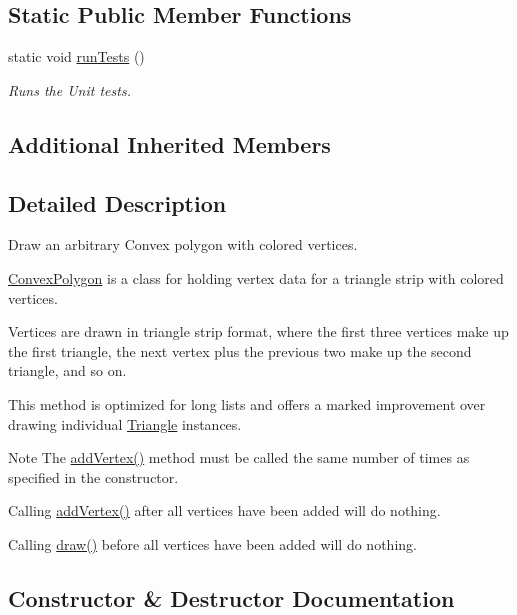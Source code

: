 \subsection*{Static Public Member Functions}
\begin{DoxyCompactItemize}
\item 
static void \hyperlink{classtsgl_1_1_convex_polygon_ac309bc2b2f142b0a02b9dc38e901daeb}{run\+Tests} ()
\begin{DoxyCompactList}\small\item\em Runs the Unit tests. \end{DoxyCompactList}\end{DoxyCompactItemize}
\subsection*{Additional Inherited Members}


\subsection{Detailed Description}
Draw an arbitrary Convex polygon with colored vertices. 

\hyperlink{classtsgl_1_1_convex_polygon}{Convex\+Polygon} is a class for holding vertex data for a triangle strip with colored vertices.

Vertices are drawn in triangle strip format, where the first three vertices make up the first triangle, the next vertex plus the previous two make up the second triangle, and so on.

This method is optimized for long lists and offers a marked improvement over drawing individual \hyperlink{classtsgl_1_1_triangle}{Triangle} instances. \begin{DoxyNote}{Note}
The \hyperlink{classtsgl_1_1_convex_polygon_a60d17a5ac80a796d05dfeff855791cc0}{add\+Vertex()} method must be called the same number of times as specified in the constructor. 

Calling \hyperlink{classtsgl_1_1_convex_polygon_a60d17a5ac80a796d05dfeff855791cc0}{add\+Vertex()} after all vertices have been added will do nothing. 

Calling \hyperlink{classtsgl_1_1_convex_polygon_add4d4971a5d22385eebbfe771af916b5}{draw()} before all vertices have been added will do nothing. 
\end{DoxyNote}


\subsection{Constructor \& Destructor Documentation}
\hypertarget{classtsgl_1_1_convex_polygon_a4ae2bd47b2a9f89aec5906c4e7ae3c10}{}
